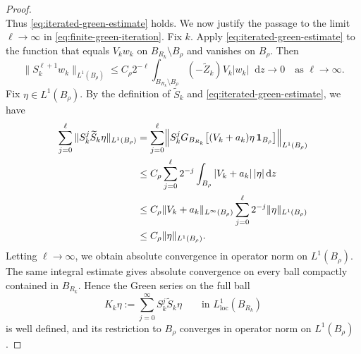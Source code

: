 \documentclass[10pt,a4paper]{amsart}
\newcommand{\dd}{\mathop{}\!\mathrm{d}}
\theoremstyle{plain}
\theoremstyle{remark}
\begin{document}
\begin{proof}
{\[\]
}
 Thus \eqref{eq:iterated-green-estimate} holds.  We now justify the passage to the limit
$\ell\to\infty$ in \eqref{eq:finite-green-iteration}.
Fix $k$.  Apply \eqref{eq:iterated-green-estimate} to the function that
equals $V_kw_k$ on $B_{R_k}\setminus B_\rho$ and vanishes on $B_\rho$.
Then
{
\[
 \|S_k^{\ell+1}w_k\|_{L^1(B_\rho)}
 \le C_\rho 2^{-\ell}
 \int_{B_{R_k}\setminus B_\rho}
 (-\widetilde Z_k)V_k|w_k|\dd z\to0
 \quad\text{as }\ell\to\infty.
\]
}
 Fix $\eta\in L^1(B_\rho)$.  By the
definition of $\widetilde S_k$ and
\eqref{eq:iterated-green-estimate}, we have
{
\[
\begin{aligned}
 \sum_{j=0}^{\ell}
 \|S_k^j\widetilde S_k\eta\|_{L^1(B_\rho)}
 &=\sum_{j=0}^{\ell}
 \Bigl\|S_k^jG_{B_{R_k}}
 \big[(V_k+a_k)\eta\,\mathbf 1_{B_\rho}\big]
 \Bigr\|_{L^1(B_\rho)}\\
 &\le C_\rho\sum_{j=0}^{\ell}2^{-j}
 \int_{B_\rho}|V_k+a_k|\,|\eta|\dd z\\
 &\le C_\rho\|V_k+a_k\|_{L^\infty(B_\rho)}
 \sum_{j=0}^{\ell}2^{-j}
 \|\eta\|_{L^1(B_\rho)}\\
 &\le C_\rho\|\eta\|_{L^1(B_\rho)}.
\end{aligned}
\]
}
{Letting \(\ell\to\infty\), we obtain absolute convergence in operator
norm on \(L^1(B_\rho)\). The same integral estimate gives absolute
convergence on every ball compactly contained in \(B_{R_k}\). Hence the
Green series on the full ball}
{
\begin{equation}\label{eq:fixed-core-green-series}
 K_k\eta:=\sum_{j=0}^{\infty}S_k^j\widetilde S_k\eta
 \qquad\text{in }L^1_{\mathrm{loc}}(B_{R_k})
\end{equation}
}
is well defined, and its restriction to $B_\rho$ converges in operator
norm on $L^1(B_\rho)$.


\end{proof}
\end{document}
